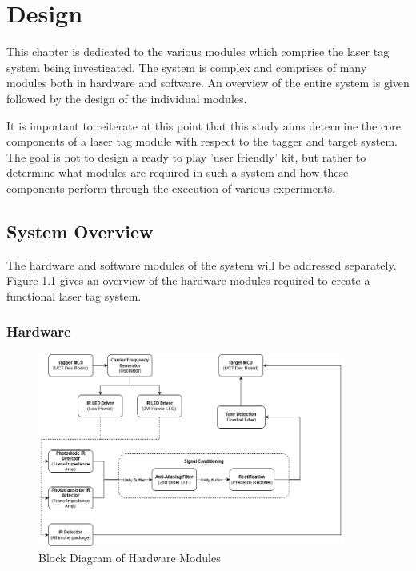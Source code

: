 \chapter{Design}
\label{ch_design}

This chapter is dedicated to the various modules which comprise the laser tag system being investigated. The system is complex and comprises of many modules both in hardware and software. An overview of the entire system is given followed by the design of the individual modules.

It is important to reiterate at this point that this study aims determine the core components of a laser tag module with respect to the tagger and target system. The goal is not to design a ready to play 'user friendly' kit, but rather to determine what modules are required in such a system and how these components perform through the execution of various experiments.

\section{System Overview}

The hardware and software modules of the system will be addressed separately. Figure \ref{fig:system_overview_hardware} gives an overview of the hardware modules required to create a functional laser tag system.

\subsection{Hardware}

\begin{figure}[H]
	\centering
	\includegraphics[width=0.9\textwidth]{figures/design/system_overview_hardware}
	\caption{Block Diagram of Hardware Modules}
	\label{fig:system_overview_hardware}
\end{figure}


